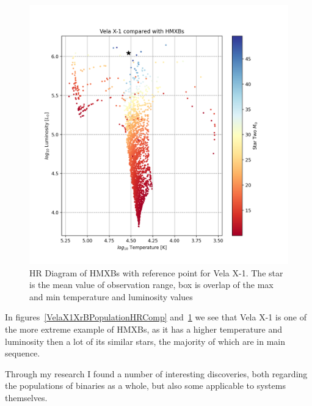 \documentclass[12pt, a4paper]{article}
\begin{document}
    \begin{figure}[H] 
        \centering
        \includegraphics[scale = .6]{figs/GeneratedFigs/VelaX-1/VelaX1HMXBPopulationHRComp.png}
        \caption{HR Diagram of HMXBs with reference point for Vela X-1. The star is the mean value of observation range, box is overlap of the max and min temperature and luminosity values}
        \label{VelaX1HMXBPopulationHRComp}
    \end{figure}


    In figures~\ref{VelaX1XrBPopulationHRComp} and~\ref{VelaX1HMXBPopulationHRComp} we see that Vela X-1 is one of the more extreme example of HMXBs, as it has a higher temperature and luminosity then a lot of its similar stars, the majority of which are in main sequence.
    

        Through my research I found a number of interesting discoveries, both regarding the populations of binaries as a whole, but also some applicable to systems themselves.
  
        
        
\end{document}
